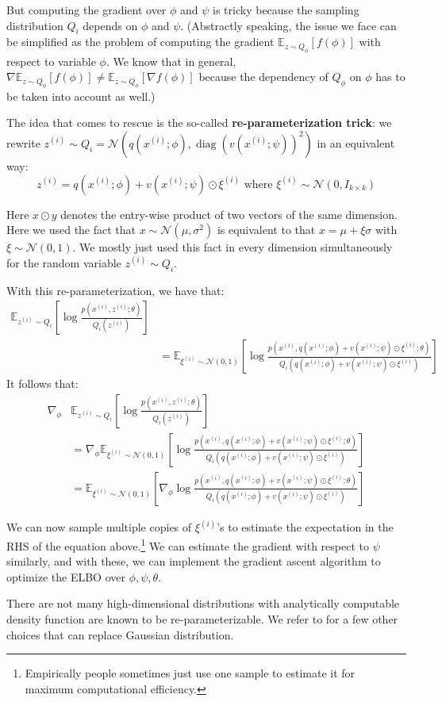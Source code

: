 But computing the gradient over $\phi$ and $\psi$ is tricky because the sampling
distribution $Q_i$ depends on $\phi$ and $\psi$. (Abstractly speaking, the issue we
face can be simplified as the problem of computing the gradient $\mathbb E_{z \sim Q_\phi} [f(\phi)]$
with respect to variable $\phi$. We know that in general, $\nabla \mathbb E_{z \sim Q_\phi} [f(\phi)] \ne
\mathbb E_{z \sim Q_\phi} [\nabla f(\phi)]$ because the dependency of $Q_\phi$ on $\phi$ has to be taken into
account as well.)

The idea that comes to rescue is the so-called \textbf{re-parameterization
trick}: we rewrite $z^{(i)} \sim Q_i = \mathcal N(q(x^{(i)} ;\phi),\operatorname{diag}(v(x^{(i)} ;\psi))^2)$ in an equivalent
way:
\begin{equation}
    z^{(i)} = q(x^{(i)} ;\phi) + v(x^{(i)} ;\psi) \odot \xi^{(i)} \text{ where } \xi^{(i)} \sim \mathcal N(0,I_{k \times k})
\end{equation}

Here $x \odot y$ denotes the entry-wise product of two vectors of the same
dimension. Here we used the fact that $x \sim \mathcal N(\mu,\sigma^2 )$ is equivalent to that
$x = \mu+\xi \sigma$ with $\xi \sim \mathcal N(0,1)$. We mostly just used this fact in every dimension
simultaneously for the random variable $z^{(i)} \sim Q_i$.

With this re-parameterization, we have that:
\begin{align}
    \mathbb E_{z^{(i)} \sim Q_i} \left[\log\frac{p(x^{(i)} ,z^{(i)} ;\theta)}{Q_i(z^{(i)})}\right]\\
        &= \mathbb E_{\xi^{(i)} \sim\mathcal N(0,1)} \left[\log \frac{p(x^{(i)} ,q(x^{(i)} ;\phi) + v(x^{(i)} ;\psi) \odot \xi^{(i)} ;\theta)}{Q_i (q(x^{(i)} ;\phi) + v(x^{(i)} ;\psi) \odot \xi^{(i)} )}\right]
\end{align}
It follows that:
\begin{align}
    \nabla_\phi& \mathbb E_{z^{(i)} \sim Q_i} \left[ \log\frac{p(x^{(i)} ,z^{(i)} ;\theta)}{Q_i(z^{(i)})}\right]\\
        &= \nabla_\phi \mathbb E_{\xi^{(i)} \sim\mathcal N(0,1)} \left[ \log\frac{p(x^{(i)} ,q(x^{(i)} ;\phi) + v(x^{(i)} ;\psi) \odot \xi^{(i)} ;\theta)}{Q_i (q(x^{(i)} ;\phi) + v(x^{(i)} ;\psi) \odot \xi^{(i)} )}\right]\\
        &= \mathbb E_{\xi^{(i)} \sim\mathcal N(0,1)} \left[\nabla_\phi \log \frac{p(x^{(i)} ,q(x^{(i)} ;\phi) + v(x^{(i)} ;\psi) \odot \xi^{(i)} ;\theta)}{Q_i (q(x^{(i)} ;\phi) + v(x^{(i)} ;\psi) \odot \xi^{(i)} )}\right]
\end{align}

We can now sample multiple copies of $\xi^{(i)}$'s to estimate the %
expectation in the RHS of the equation above.\footnote{Empirically people sometimes just use one sample to estimate it for maximum
computational efficiency.} We can estimate the gradient with
respect to $\psi$ similarly, and with these, we can implement the gradient ascent
algorithm to optimize the ELBO over $\phi,\psi,\theta$.

There are not many high-dimensional distributions with analytically
computable density function are known to be re-parameterizable. We refer to \citeauthor{kingma2013auto}
for a few other choices that can replace Gaussian distribution.
